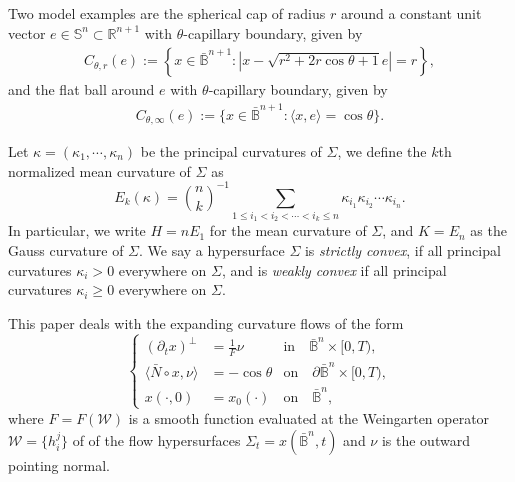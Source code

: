 \documentclass[11pt,reqno]{amsart}
\theoremstyle{definition}
\theoremstyle{remark}
\numberwithin{equation}{section}
\renewcommand{\(}{\left(}
\renewcommand{\)}{\right)}
\renewcommand{\-}{\overline}
\renewcommand{\k}{\kappa}
\renewcommand{\t}{\theta}
\begin{document}
Two model examples are the spherical cap of radius $r$ around a constant unit vector $e\in \mathbb{S}^n\subset\mathbb R^{n+1}$ with $\t$-capillary boundary, given by
\begin{align}\label{s1:spherical-cap}
	C_{\theta,r}(e):=\left\{x\in \bar{\mathbb B}^{n+1}:\left| x-\sqrt{r^2+2r\cos\t+1}e\right|=r\right\},
\end{align}
and the {flat ball} around $e$ with $\t$-capillary boundary, given by
\begin{align}\label{s1:flat-disk}
	C_{\theta,\infty}(e):=\{ x\in \bar{\mathbb B}^{n+1}:\langle x,e\rangle=\cos\t\}.
\end{align}

Let $\kappa=(\kappa_1,\cdots,\kappa_n)$ be the principal curvatures of $\Sigma$, we define the $k$th normalized mean curvature of $\Sigma$ as 
\begin{equation*}
	E_k(\kappa)=\binom{n}{k}^{-1}\sum_{1\leq i_1<i_2<\cdots<i_k\leq n}{\kappa_{i_1}\kappa_{i_2}\cdots\kappa_{i_n}}.
\end{equation*}
In particular, we write $H=nE_1$ for the mean curvature of $\Sigma$, and $K=E_n$ as the Gauss curvature of $\Sigma$. We say a hypersurface $\Sigma$ is {\em strictly convex}, if all principal curvatures $\k_i>0$ everywhere on $\Sigma$, and is {\em weakly convex} if all principal curvatures $\kappa_i\geq 0$ everywhere on $\Sigma$.

This paper deals with the expanding curvature flows of the form
\begin{equation}\label{Inverse-flow}
	\left\{\begin{aligned}
		\left(\partial_t x\right)^{\bot}&=\frac{1}{F}\nu &\text{in}\quad \bar{\mathbb{B}}^n \times[0,T),\\
		\langle\bar{N}\circ x,\nu\rangle&=-\cos\theta  &\text{on}\quad \partial\bar{\mathbb{B}}^n \times[0,T),\\
		x(\cdot,0)&=x_0(\cdot)  &\text{on} \quad \bar{\mathbb{B}}^n,
	\end{aligned}\right.
\end{equation}
where  $F=F(\mathcal{W})$  is a smooth function evaluated at the Weingarten operator $\mathcal{W}=\{h_i^j\}$ of of the flow
hypersurfaces  $\Sigma_t=x(\bar{\mathbb{B}}^n,t)$ and $\nu$ is the outward pointing
normal. 
\end{document}
